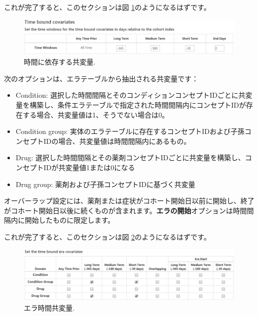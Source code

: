 \documentclass[
  11pt]{book}
\providecommand{\tightlist}{%
  \setlength{\itemsep}{0pt}\setlength{\parskip}{0pt}}
\theoremstyle{definition}
\theoremstyle{definition}
\theoremstyle{definition}
\theoremstyle{definition}
\theoremstyle{remark}
\begin{document}
これが完了すると、このセクションは図 \ref{fig:covariateSettings3}のようになるはずです。

\begin{figure}

{\centering \includegraphics[width=1\linewidth]{images/PatientLevelPrediction/covariateSettings3} 

}

\caption{時間に依存する共変量.}\label{fig:covariateSettings3}
\end{figure}

次のオプションは、エラテーブルから抽出される共変量です：

\begin{itemize}
\tightlist
\item
  Condition: 選択した時間間隔とそのコンディションコンセプトIDごとに共変量を構築し、条件エラテーブルで指定された時間間隔内にコンセプトIDが存在する場合、共変量値は1、そうでない場合は0。
\item
  Condition group: 実体のエラテーブルに存在するコンセプトIDおよび子孫コンセプトIDの場合、共変量値は時間間隔内にあるもの。
\item
  Drug: 選択した時間間隔とその薬剤コンセプトIDごとに共変量を構築し、コンセプトIDが共変量値1または0になる
\item
  Drug group: 薬剤および子孫コンセプトIDに基づく共変量
\end{itemize}

オーバーラップ設定には、薬剤または症状がコホート開始日以前に開始し、終了がコホート開始日以後に続くものが含まれます。\textbf{エラの開始}オプションは時間間隔内に開始したものに限定します。

これが完了すると、このセクションは図 \ref{fig:covariateSettings4}のようになるはずです。

\begin{figure}

{\centering \includegraphics[width=1\linewidth]{images/PatientLevelPrediction/covariateSettings4} 

}

\caption{エラ時間共変量.}\label{fig:covariateSettings4}
\end{figure}
\end{document}
